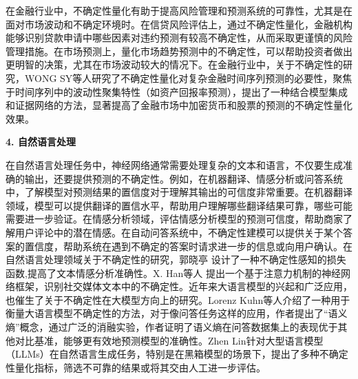 在金融行业中，不确定性量化有助于提高风险管理和预测系统的可靠性，尤其是在面对市场波动和不确定环境时。在信贷风险评估上，通过不确定性量化，金融机构能够识别贷款申请中哪些因素对违约预测有较高不确定性，从而采取更谨慎的风险管理措施。在市场预测上，量化市场趋势预测中的不确定性，可以帮助投资者做出更明智的决策，尤其在市场波动较大的情况下。在金融行业中，关于不确定性的研究，WONG SY等人\cite{wong2025quantifying}研究了不确定性量化对复杂金融时间序列预测的必要性，聚焦于时间序列中的波动性聚集特性（如资产回报率预测），提出了一种结合模型集成和证据网络的方法，显著提高了金融市场中加密货币和股票的预测的不确定性量化效果。

\textbf{4. 自然语言处理}

在自然语言处理任务中，神经网络通常需要处理复杂的文本和语言，不仅要生成准确的输出，还要提供预测的不确定性。例如，在机器翻译、情感分析或问答系统中，了解模型对预测结果的置信度对于理解其输出的可信度非常重要。在机器翻译领域，模型可以提供翻译的置信水平，帮助用户理解哪些翻译结果可靠，哪些可能需要进一步验证。在情感分析领域，评估情感分析模型的预测可信度，帮助商家了解用户评论中的潜在情感。在自动问答系统中，不确定性建模可以提供关于某个答案的置信度，帮助系统在遇到不确定的答案时请求进一步的信息或向用户确认。在自然语言处理领域关于不确定性的研究，郭晓亭\cite{1022812574.nh} 设计了一种不确定性感知的损失函数,提高了文本情感分析准确性。X. Han等人\cite{han2019attention} 提出一个基于注意力机制的神经网络框架，识别社交媒体文本中的不确定性。近年来大语言模型的兴起和广泛应用，也催生了关于不确定性在大模型方向上的研究。Lorenz Kuhn等人\cite{kuhn2023semantic}介绍了一种用于衡量大语言模型不确定性的方法，对于像问答任务这样的应用，作者提出了“语义熵”概念，通过广泛的消融实验，作者证明了语义熵在问答数据集上的表现优于其他对比基准，能够更有效地预测模型的准确性。Zhen Lin\cite{lin2024generating}针对大型语言模型（LLMs）在自然语言生成任务，特别是在黑箱模型的场景下，提出了多种不确定性量化指标，筛选不可靠的结果或将其交由人工进一步评估。




